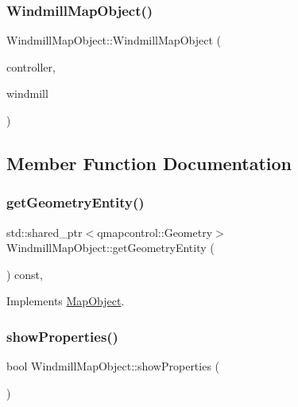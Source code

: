 \subsubsection{\texorpdfstring{WindmillMapObject()}{WindmillMapObject()}}
{\footnotesize\ttfamily Windmill\+Map\+Object\+::\+Windmill\+Map\+Object (\begin{DoxyParamCaption}\item[{\mbox{\hyperlink{class_map_objects_controller}{Map\+Objects\+Controller}} $\ast$}]{controller,  }\item[{\mbox{\hyperlink{class_windmill_data}{Windmill\+Data}} $\ast$}]{windmill }\end{DoxyParamCaption})}



\subsection{Member Function Documentation}
\mbox{\label{class_windmill_map_object_ac948b3ca6bebec5a1b99375acb557d57}} 
\subsubsection{\texorpdfstring{getGeometryEntity()}{getGeometryEntity()}}
{\footnotesize\ttfamily std\+::shared\+\_\+ptr$<$qmapcontrol\+::\+Geometry$>$ Windmill\+Map\+Object\+::get\+Geometry\+Entity (\begin{DoxyParamCaption}{ }\end{DoxyParamCaption}) const\hspace{0.3cm}{\ttfamily [inline]}, {\ttfamily [virtual]}}



Implements \mbox{\hyperlink{class_map_object_a82e055e41c862ec8d80d5bfb137b3253}{Map\+Object}}.

\mbox{\label{class_windmill_map_object_a692d7518785f4894fae0abf5776bd8c9}} 
\subsubsection{\texorpdfstring{showProperties()}{showProperties()}}
{\footnotesize\ttfamily bool Windmill\+Map\+Object\+::show\+Properties (\begin{DoxyParamCaption}{ }\end{DoxyParamCaption})\hspace{0.3cm}{\ttfamily [virtual]}}



